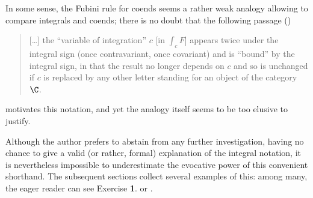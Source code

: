 \begin{remark}
In some sense, the Fubini rule for coends seems a rather weak analogy allowing to compare integrals and coends; there is no doubt that the following passage (\cite[\textbf{IX.5}]{McL})
\begin{quote}
[\dots] the ``variable of integration'' $c$ [in $\int_c F$] appears twice under the integral sign (once contravariant, once covariant) and is ``bound'' by the integral sign, in that the result no longer depends on $c$ and so is unchanged if $c$ is replaced by any other letter standing for an object of the category $\C$.
\end{quote}
motivates this notation, and yet the analogy itself seems to be too elusive to justify.%

Although the author prefers to abstain from any further investigation, having no chance to give a valid (or rather, formal) explanation of the integral notation, it is nevertheless impossible to underestimate the evocative power of this convenient shorthand. The subsequent sections collect several examples of this: among many, the eager reader can see Exercise \textbf{1}. or .
\end{remark}
